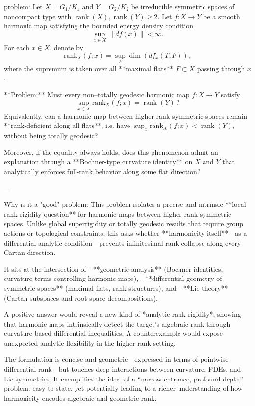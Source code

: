 problem:  
Let \( X = G_1/K_1 \) and \( Y = G_2/K_2 \) be irreducible symmetric spaces of noncompact type with \( \operatorname{rank}(X), \operatorname{rank}(Y) \ge 2 \).  
Let \( f: X \to Y \) be a smooth harmonic map satisfying the bounded energy density condition  
\[
\sup_{x \in X} \|df(x)\| < \infty .
\]  
For each \(x \in X\), denote by  
\[
\mathrm{rank}_X(f;x) = \sup_{F} \dim(df_x(T_xF)),
\]  
where the supremum is taken over all **maximal flats** \(F \subset X\) passing through \(x\).  

**Problem:**  
Must every non–totally geodesic harmonic map \(f: X \to Y\) satisfy  
\[
\sup_{x \in X}\mathrm{rank}_X(f;x) = \operatorname{rank}(Y) \,?
\]
Equivalently, can a harmonic map between higher-rank symmetric spaces remain **rank-deficient along all flats**, i.e. have  
\(\sup_{x}\mathrm{rank}_X(f;x) < \operatorname{rank}(Y)\),  
without being totally geodesic?  

Moreover, if the equality always holds, does this phenomenon admit an explanation through a **Bochner-type curvature identity** on \(X\) and \(Y\) that analytically enforces full-rank behavior along some flat direction?  

---

Why is it a "good" problem:  
This problem isolates a precise and intrinsic **local rank-rigidity question** for harmonic maps between higher-rank symmetric spaces. Unlike global superrigidity or totally geodesic results that require group actions or topological constraints, this asks whether **harmonicity itself**—as a differential analytic condition—prevents infinitesimal rank collapse along every Cartan direction.  

It sits at the intersection of  
- **geometric analysis** (Bochner identities, curvature terms controlling harmonic maps),  
- **differential geometry of symmetric spaces** (maximal flats, rank structures), and  
- **Lie theory** (Cartan subspaces and root-space decompositions).  

A positive answer would reveal a new kind of *analytic rank rigidity*, showing that harmonic maps intrinsically detect the target’s algebraic rank through curvature-based differential inequalities. A counterexample would expose unexpected analytic flexibility in the higher-rank setting.  

The formulation is concise and geometric—expressed in terms of pointwise differential rank—but touches deep interactions between curvature, PDEs, and Lie symmetries. It exemplifies the ideal of a “narrow entrance, profound depth” problem: easy to state, yet potentially leading to a richer understanding of how harmonicity encodes algebraic and geometric rank.
